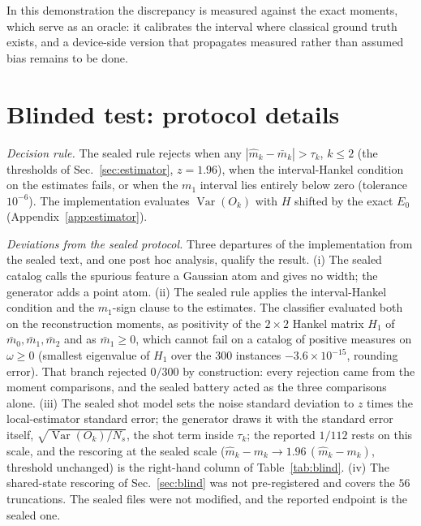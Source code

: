 \documentclass[submission, PhysCore]{SciPost}
\begin{document}
\begin{appendix}
In this demonstration the discrepancy is measured against the exact moments, which serve as an oracle: it calibrates the interval where classical ground truth exists, and a device-side version that propagates measured rather than assumed bias remains to be done.

\section{Blinded test: protocol details}
\label{app:blinddetails}
\emph{Decision rule.} The sealed rule rejects when any $|\widehat m_k-\bar m_k|>\tau_k$, $k\le2$ (the thresholds of Sec.~\ref{sec:estimator}, $z=1.96$), when the interval-Hankel condition on the estimates fails, or when the $m_1$ interval lies entirely below zero (tolerance $10^{-6}$). The implementation evaluates $\operatorname{Var}(O_k)$ with $H$ shifted by the exact $E_0$ (Appendix~\ref{app:estimator}).

\emph{Deviations from the sealed protocol.} Three departures of the implementation from the sealed text, and one post hoc analysis, qualify the result. (i) The sealed catalog calls the spurious feature a Gaussian atom and gives no width; the generator adds a point atom. (ii) The sealed rule applies the interval-Hankel condition and the $m_1$-sign clause to the estimates. The classifier evaluated both on the reconstruction moments, as positivity of the $2\times2$ Hankel matrix $H_1$ of $\bar m_0,\bar m_1,\bar m_2$ and as $\bar m_1\ge0$, which cannot fail on a catalog of positive measures on $\omega\ge0$ (smallest eigenvalue of $H_1$ over the $300$ instances $-3.6\times10^{-15}$, rounding error). That branch rejected $0/300$ by construction: every rejection came from the moment comparisons, and the sealed battery acted as the three comparisons alone. (iii) The sealed shot model sets the noise standard deviation to $z$ times the local-estimator standard error; the generator draws it with the standard error itself, $\sqrt{\operatorname{Var}(O_k)/N_s}$, the shot term inside $\tau_k$; the reported $1/112$ rests on this scale, and the rescoring at the sealed scale ($\widehat m_k-m_k\to1.96\,(\widehat m_k-m_k)$, threshold unchanged) is the right-hand column of Table~\ref{tab:blind}. (iv) The shared-state rescoring of Sec.~\ref{sec:blind} was not pre-registered and covers the $56$ truncations. The sealed files were not modified, and the reported endpoint is the sealed one.


\end{appendix}
\end{document}
